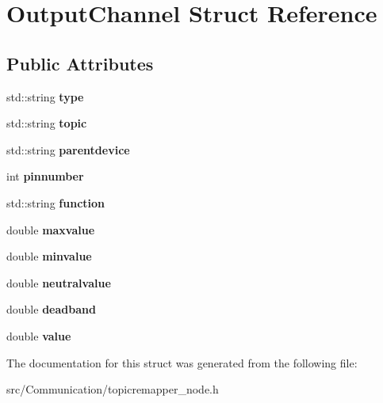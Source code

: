 \hypertarget{structOutputChannel}{}\section{Output\+Channel Struct Reference}
\label{structOutputChannel}
\subsection*{Public Attributes}
\begin{DoxyCompactItemize}
\item 
\mbox{\label{structOutputChannel_a10deda1cda4c399bba1dd8df7ad75e61}} 
std\+::string {\bfseries type}
\item 
\mbox{\label{structOutputChannel_a0307fb1c6ddb8d9faa7755ff3c8cf7ab}} 
std\+::string {\bfseries topic}
\item 
\mbox{\label{structOutputChannel_a1289b34ae995e33d8ecb33309775a70d}} 
std\+::string {\bfseries parentdevice}
\item 
\mbox{\label{structOutputChannel_afb08a2831221468da6d29cf09b979db1}} 
int {\bfseries pinnumber}
\item 
\mbox{\label{structOutputChannel_a57553a444e462764f2f128e3693bd558}} 
std\+::string {\bfseries function}
\item 
\mbox{\label{structOutputChannel_a7878880920be65180cc27c9c89236593}} 
double {\bfseries maxvalue}
\item 
\mbox{\label{structOutputChannel_ac6c366709ce59f3a6d7d99bdb2babb95}} 
double {\bfseries minvalue}
\item 
\mbox{\label{structOutputChannel_a354c960f46672c803d7fa63775423711}} 
double {\bfseries neutralvalue}
\item 
\mbox{\label{structOutputChannel_a9196c8afca9fc8063f6cdfded9463331}} 
double {\bfseries deadband}
\item 
\mbox{\label{structOutputChannel_a66b90830fcb700e8c7e3e29070276962}} 
double {\bfseries value}
\end{DoxyCompactItemize}


The documentation for this struct was generated from the following file\+:\begin{DoxyCompactItemize}
\item 
src/\+Communication/topicremapper\+\_\+node.\+h\end{DoxyCompactItemize}
